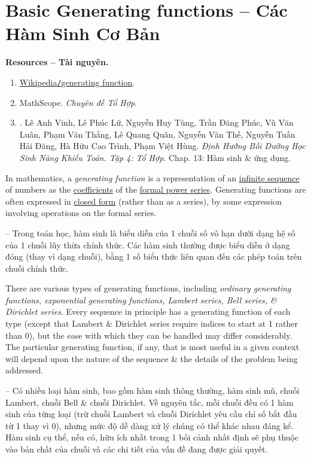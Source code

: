 \documentclass[oneside]{book}
\begin{document}
\section{Basic Generating functions -- Các Hàm Sinh Cơ Bản}
\textbf{\textbf{Resources -- Tài nguyên.}}
\begin{enumerate}
	\item \href{https://en.wikipedia.org/wiki/Generating_function}{Wikipedia{\tt/}generating function}.
	\item MathScope. {\it Chuyên đề Tổ Hợp}.
	\item \cite{Vinh_Lu_Olympic_Toan_to_hop}. {\sc Lê Anh Vinh, Lê Phúc Lữ, Nguyễn Huy Tùng, Trần Đăng Phúc, Vũ Văn Luân, Phạm Văn Thắng, Lê Quang Quân, Nguyễn Văn Thế, Nguyễn Tuấn Hải Đăng, Hà Hữu Cao Trình, Phạm Việt Hùng}. {\it Định Hướng Bồi Dưỡng Học Sinh Năng Khiếu Toán. Tập 4: Tổ Hợp}. Chap. 13: Hàm sinh \& ứng dụng.
\end{enumerate}
In mathematics, a {\it generating function} is a representation of an \href{https://en.wikipedia.org/wiki/Infinite_sequence}{infinite sequence} of numbers as the \href{https://en.wikipedia.org/wiki/Coefficient}{coefficients} of the \href{https://en.wikipedia.org/wiki/Formal_power_series}{formal power series}. Generating functions are often expressed in \href{https://en.wikipedia.org/wiki/Closed-form_expression}{closed form} (rather than as a series), by some expression involving operations on the formal series.

-- Trong toán học, hàm sinh là biểu diễn của 1 chuỗi số vô hạn dưới dạng hệ số của 1 chuỗi lũy thừa chính thức. Các hàm sinh thường được biểu diễn ở dạng đóng (thay vì dạng chuỗi), bằng 1 số biểu thức liên quan đến các phép toán trên chuỗi chính thức.

There are various types of generating functions, including {\it ordinary generating functions, exponential generating functions, Lambert series, Bell series, \& Dirichlet series}. Every sequence in principle has a generating function of each type (except that Lambert \& Dirichlet series require indices to start at 1 rather than 0), but the ease with which they can be handled may differ considerably. The particular generating function, if any, that is most useful in a given context will depend upon the nature of the sequence \& the details of the problem being addressed.

-- Có nhiều loại hàm sinh, bao gồm hàm sinh thông thường, hàm sinh mũ, chuỗi Lambert, chuỗi Bell \& chuỗi Dirichlet. Về nguyên tắc, mỗi chuỗi đều có 1 hàm sinh của từng loại (trừ chuỗi Lambert và chuỗi Dirichlet yêu cầu chỉ số bắt đầu từ 1 thay vì 0), nhưng mức độ dễ dàng xử lý chúng có thể khác nhau đáng kể. Hàm sinh cụ thể, nếu có, hữu ích nhất trong 1 bối cảnh nhất định sẽ phụ thuộc vào bản chất của chuỗi và các chi tiết của vấn đề đang được giải quyết.
\end{document}
